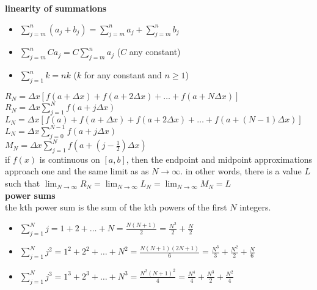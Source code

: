 \documentclass{article}
\begin{document}
\textbf{linearity of summations}
	\begin{itemize}
		\item $\sum_{j=m}^{n}(a_j + b_j) = \sum_{j=m}^{n}a_j + \sum_{j=m}^{n}b_j$
		\item $\sum_{j=m}^{n}Ca_j = C\sum_{j=m}^{n}a_j$ ($C$ any constant)
		\item $\sum_{j=1}^{n}k = nk$ ($k$ for any constant and $n \geq 1$)
	\end{itemize}

$R_N = \Delta x[f(a + \Delta x) + f(a + 2\Delta x) + \ldots + f(a + N\Delta x)]$\\
$R_N = \Delta x\sum_{j=1}^{N}f(a + j\Delta x)$\\
$L_N = \Delta x[f(a) + f(a + \Delta x) + f(a + 2\Delta x) + \ldots + f(a + (N -1)\Delta x)]$\\
$L_N = \Delta x\sum_{j=0}^{N-1}f(a + j\Delta x)$\\
$M_N = \Delta x\sum_{j=1}^{N}f(a + (j - \frac{1}{2})\Delta x)$\\

if $f(x)$ is continuous on $[a, b]$, then the endpoint and midpoint approximations approach one and the same limit as as $N \to \infty$. in other words, there is a value $L$ such that $\lim_{N \to \infty}R_N = \lim_{N \to \infty}L_N = \lim_{N \to \infty}M_N = L$\\

\textbf{power sums}\\
the kth power sum is the sum of the kth powers of the first $N$ integers.\\
	\begin{itemize}
		\item $\sum_{j=1}^{N}j = 1 + 2 + \ldots + N = \frac{N(N + 1)}{2} = \frac{N^2}{2} + \frac{N}{2}$
		\item $\sum_{j=1}^{N}j^2 = 1^2 + 2^2 + \ldots + N^2 = \frac{N(N + 1)(2N + 1)}{6} = \frac{N^3}{3} + \frac{N^2}{2} + \frac{N}{6}$ 
		\item $\sum_{j=1}^{N}j^3 = 1^3 + 2^3 + \ldots + N^3 = \frac{N^2(N + 1)^2}{4} = \frac{N^4}{4} + \frac{N^3}{2} + \frac{N^2}{4}$ 
	\end{itemize}
\end{document}
